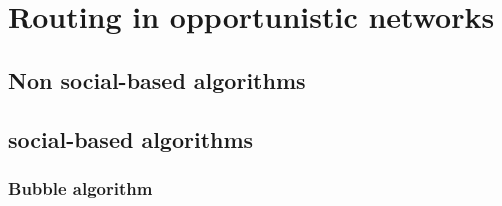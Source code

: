 \section{Routing in opportunistic networks}
\label{routing}


\subsection{Non social-based algorithms}
\label{r_non_social}


\subsection{social-based algorithms}
\label{r_social}




\subsubsection{Bubble algorithm}
\label{r_bubble}

%
%
%
